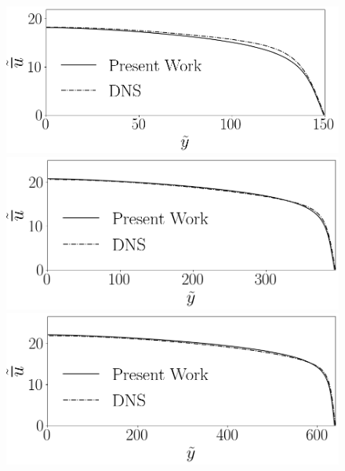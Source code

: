 \begin{figure}[!h]
	\centering
	\begin{minipage}[t]{0.5\textwidth}
		\centering
		\includegraphics[angle=0, scale=0.34]{fotos_formatacao_final/Temperature_150_Avelocity}
	\end{minipage}
	\begin{minipage}[t]{0.45\textwidth}
		\centering
		\includegraphics[angle=0, scale=0.34]{fotos_formatacao_final/Temperature_395_Avelocity}
	\end{minipage}
	\begin{minipage}[t]{0.5\textwidth}
		\centering
		\includegraphics[angle=0, scale=0.34]{fotos_formatacao_final/Temperature_640_Avelocity}

\end{minipage}
\end{figure}
